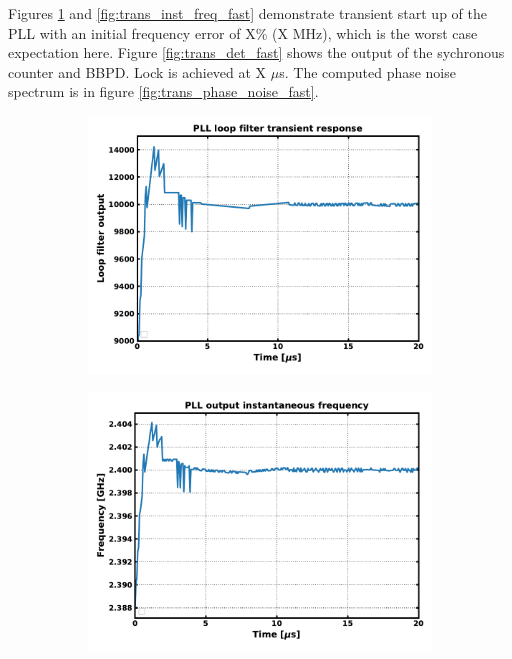 		Figures \ref{fig:trans_lf_fast} and \ref{fig:trans_inst_freq_fast} demonstrate transient start up of the PLL with an initial frequency error of X\% (X MHz), which is the worst case expectation here. Figure \ref{fig:trans_det_fast} shows the output of the sychronous counter and BBPD. Lock is achieved at X $\mu$s. The computed phase noise spectrum is in figure \ref{fig:trans_phase_noise_fast}.

			\begin{figure}[htb!]
			    \centering
			    \begin{subfigure}{0.5\textwidth}
			        \centering
			        \center\includegraphics[width=1.0\textwidth, angle=0]{figs/trans_loop_filter_fast.pdf}
			        \caption{ }
			        \label{fig:trans_lf_fast}
			    \end{subfigure}%
			    \begin{subfigure}{0.5\textwidth}
			        \centering
			        \center\includegraphics[width=1.0\textwidth, angle=0]{figs/trans_inst_freq_fast.pdf}

\end{subfigure}
\end{figure}
